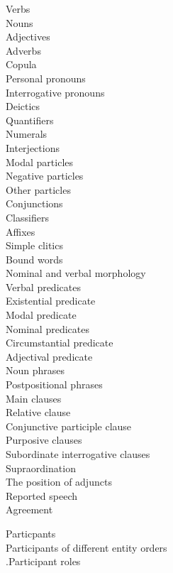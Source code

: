 \documentclass[a4paper,12pt]{article}
\begin{document}
\begin{figure}
\parbox[t]{8cm}{
 Verbs\\
 Nouns\\
 Adjectives\\
 Adverbs\\
 Copula\\
 Personal pronouns\\
 Interrogative pronouns\\
 Deictics\\
 Quantifiers\\
 Numerals\\
 Interjections\\
 Modal particles\\
 Negative particles\\
 Other particles\\
 Conjunctions\\
 Classifiers\\ 
 Affixes\\
 Simple clitics\\
 Bound words\\
 Nominal and verbal morphology\\
 Verbal predicates\\
 Existential predicate\\
 Modal predicate\\
 Nominal predicates\\
 Circumstantial predicate\\
 Adjectival predicate \\
 Noun phrases\\  
 Postpositional phrases\\
 Main clauses\\
 Relative clause\\
 Conjunctive participle clause\\
 Purposive clauses\\
 Subordinate interrogative clauses\\
 Supraordination\\
 The position of adjuncts\\
 Reported speech\\
 Agreement\\
}
\parbox[t]{8cm}{
Particpants\\
Participants of different entity orders \\
.\hspace{.5cm}Participant roles \\
}
\end{figure}
\end{document}
